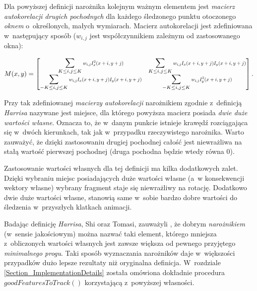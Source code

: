     \newpage
    Dla powyższej definicji narożnika kolejnym ważnym elementem jest \textit{macierz autokorelacji drugich pochodnych} dla każdego śledzonego punktu otoczonego \textit{oknem} o~określonych, małych wymiarach. Macierz autokorelacji jest zdefiniowana w~następujący sposób ($w_{i,j}$ jest współczynnikiem zależnym od zastosowanego okna):

      \begin{equation}
        M(x, y) =
          \begin{bmatrix}
              \displaystyle\sum\limits_{K \le i, j \le K}
                \scalemath{0.75}{w_{i,j} I_{x}^{2} (x + i, y + j)} &
              \displaystyle\sum\limits_{K \le i, j \le K}
                \scalemath{0.75}{w_{i,j} I_{x} (x + i, y + j) I_{y} (x + i, y + j)} \\

              \displaystyle\sum\limits_{-K \le i, j \le K}
                \scalemath{0.75}{w_{i,j} I_{x} (x + i, y + j) I_{y} (x + i, y + j)} &
              \displaystyle\sum\limits_{-K \le i, j \le K}
                \scalemath{0.75}{w_{i,j} I_{y}^{2} (x + i, y + j)} \\
          \end{bmatrix}.
      \end{equation}

    Przy tak zdefiniowanej \textit{macierzy autokorelacji} narożnikiem zgodnie z~definicją \textit{Harrisa} nazywane jest miejsce, dla którego powyższa macierz posiada \textit{dwie duże wartości własne}. Oznacza to, że w~danym punkcie istnieje krawędź rozciągająca się w~dwóch kierunkach, tak jak w~przypadku rzeczywistego narożnika. Warto zauważyć, że dzięki zastosowaniu drugiej pochodnej całość jest niewrażliwa na stałą wartość pierwszej pochodnej (druga pochodna będzie wtedy równa $0$).

    Zastosowanie wartości własnych dla tej definicji ma kilka dodatkowych zalet. Dzięki wybraniu miejsc posiadających duże wartości własne (a~w konsekwencji wektory własne) wybrany fragment staje się niewrażliwy na rotację. Dodatkowo dwie duże wartości własne, stanowią same w~sobie bardzo dobre wartości do śledzenia w~przyszłych klatkach animacji.

    Badając definicję \textit{Harrisa}, Shi oraz Tomasi, zauważyli \cite{GoodFeaturesToTrack94}, że dobrym \textit{narożnikiem} (w~sensie jakościowym) można nazwać taki element, którego mniejsza z~obliczonych wartości własnych jest zawsze większa od pewnego przyjętego \textit{minimalnego progu}. Taki sposób wyznaczania narożników daje w~większości przypadków dużo lepsze rezultaty niż oryginalna definicja. W~rozdziale \ref{Section_ImplementationDetails} została omówiona dokładnie procedura $goodFeaturesToTrack()$ korzystającą z~powyższej własności.

